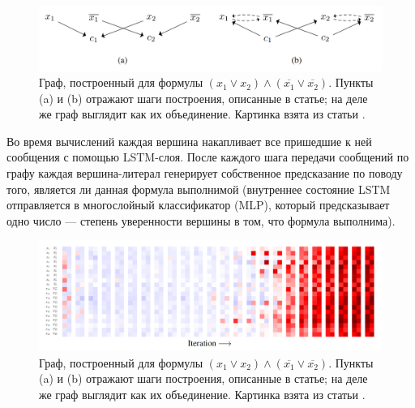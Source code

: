 \begin{figure}[ht]
\begin{center}
    \includegraphics[scale=0.25]{./assets/neurosat-mpnn.png}
    \caption{\label{neurosat-mpnn} Граф, построенный для формулы $(x_1 \vee x_2) \wedge (\overline{x_1} \vee \overline{x_2})$. Пункты (a) и (b) отражают шаги построения, описанные в статье; на деле же граф выглядит как их объединение. Картинка взята из статьи \cite{neurosat-paper}.}
\end{center}
\end{figure}

Во время вычислений каждая вершина накапливает все пришедшие к ней сообщения с помощью LSTM-слоя. После каждого шага передачи сообщений по графу каждая вершина-литерал генерирует собственное предсказание по поводу того, является ли данная формула выполнимой (внутреннее состояние LSTM отправляется в многослойный классификатор (MLP), который предсказывает одно число --- степень уверенности вершины в том, что формула выполнима).

\begin{figure}[ht]
\begin{center}
    \includegraphics[scale=0.24]{./assets/neurosat-voting.png}
    \caption{\label{neurosat-voting} Граф, построенный для формулы $(x_1 \vee x_2) \wedge (\overline{x_1} \vee \overline{x_2})$. Пункты (a) и (b) отражают шаги построения, описанные в статье; на деле же граф выглядит как их объединение. Картинка взята из статьи \cite{neurosat-paper}.}
\end{center}
\end{figure}



